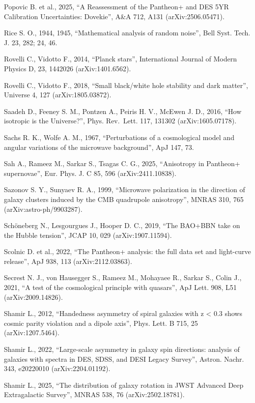 \documentclass[
  11pt,
]{article}
\begin{document}
Popovic B. et al., 2025, ``A Reassessment of the Pantheon+ and DES 5YR
Calibration Uncertainties: Dovekie'', A\&A 712, A131 (arXiv:2506.05471).

Rice S. O., 1944, 1945, ``Mathematical analysis of random noise'', Bell
Syst. Tech. J. 23, 282; 24, 46.

Rovelli C., Vidotto F., 2014, ``Planck stars'', International Journal of
Modern Physics D, 23, 1442026 (arXiv:1401.6562).

Rovelli C., Vidotto F., 2018, ``Small black/white hole stability and
dark matter'', Universe 4, 127 (arXiv:1805.03872).

Saadeh D., Feeney S. M., Pontzen A., Peiris H. V., McEwen J. D., 2016,
``How isotropic is the Universe?'', Phys. Rev.~Lett. 117, 131302
(arXiv:1605.07178).

Sachs R. K., Wolfe A. M., 1967, ``Perturbations of a cosmological model
and angular variations of the microwave background'', ApJ 147, 73.

Sah A., Rameez M., Sarkar S., Tsagas C. G., 2025, ``Anisotropy in
Pantheon+ supernovae'', Eur. Phys. J. C 85, 596 (arXiv:2411.10838).

Sazonov S. Y., Sunyaev R. A., 1999, ``Microwave polarization in the
direction of galaxy clusters induced by the CMB quadrupole anisotropy'',
MNRAS 310, 765 (arXiv:astro-ph/9903287).

Schöneberg N., Lesgourgues J., Hooper D. C., 2019, ``The BAO+BBN take on
the Hubble tension'', JCAP 10, 029 (arXiv:1907.11594).

Scolnic D. et al., 2022, ``The Pantheon+ analysis: the full data set and
light-curve release'', ApJ 938, 113 (arXiv:2112.03863).

Secrest N. J., von Hausegger S., Rameez M., Mohayaee R., Sarkar S.,
Colin J., 2021, ``A test of the cosmological principle with quasars'',
ApJ Lett. 908, L51 (arXiv:2009.14826).

Shamir L., 2012, ``Handedness asymmetry of spiral galaxies with z
\textless{} 0.3 shows cosmic parity violation and a dipole axis'', Phys.
Lett. B 715, 25 (arXiv:1207.5464).

Shamir L., 2022, ``Large-scale asymmetry in galaxy spin directions:
analysis of galaxies with spectra in DES, SDSS, and DESI Legacy
Survey'', Astron. Nachr. 343, e20220010 (arXiv:2204.01192).

Shamir L., 2025, ``The distribution of galaxy rotation in JWST Advanced
Deep Extragalactic Survey'', MNRAS 538, 76 (arXiv:2502.18781).
\end{document}
